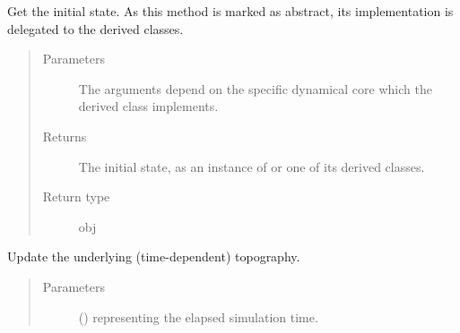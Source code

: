 \documentclass[letterpaper,10pt,english]{sphinxmanual}
\begin{document}
\begin{fulllineitems}
\begin{fulllineitems}
\begin{quote}
\begin{description}
\end{description}\end{quote}

\end{fulllineitems}


\begin{fulllineitems}
\label{\detokenize{api:dycore.dycore.DynamicalCore.get_initial_state}}
Get the initial state.
As this method is marked as abstract, its implementation is delegated to the derived classes.
\begin{quote}\begin{description}
\item[{Parameters}] \leavevmode
{} \textendash{} The arguments depend on the specific dynamical core which the derived class implements.

\item[{Returns}] \leavevmode
The initial state, as an instance of {\hyperref[\detokenize{api:storages.grid_data.GridData}]{}} or one of its derived classes.

\item[{Return type}] \leavevmode
obj

\end{description}\end{quote}

\end{fulllineitems}


\begin{fulllineitems}
\label{\detokenize{api:dycore.dycore.DynamicalCore.update_topography}}
Update the underlying (time-dependent) topography.
\begin{quote}\begin{description}
\item[{Parameters}] \leavevmode
{} () \textendash{}  representing the elapsed simulation time.

\end{description}\end{quote}

\end{fulllineitems}


\end{fulllineitems}
\end{document}

